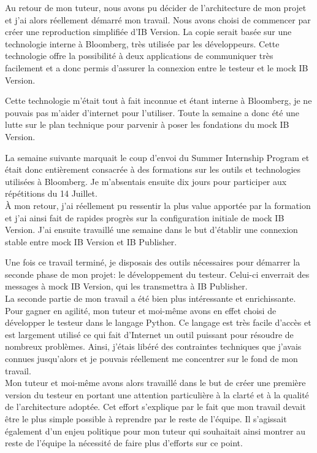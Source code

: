 \documentclass[11pt, oneside, titlepage, a4paper]{article}
\begin{document}
Au retour de mon tuteur, nous avons pu décider de l'architecture de mon projet et j'ai alors réellement démarré mon travail. Nous avons choisi de commencer par créer une reproduction simplifiée d'IB Version. La copie serait basée sur une technologie interne à Bloomberg, très utilisée par les développeurs. Cette technologie offre la possibilité à deux applications de communiquer très facilement et a donc permis d'assurer la connexion entre le testeur et le mock IB Version.

Cette technologie m'était tout à fait inconnue et étant interne à Bloomberg, je ne pouvais pas m'aider d'internet pour l'utiliser. Toute la semaine a donc été une lutte sur le plan technique pour parvenir à poser les fondations du mock IB Version.

La semaine suivante marquait le coup d'envoi du Summer Internship Program et était donc entièrement consacrée à des formations sur les outils et technologies utilisées à Bloomberg. Je m'absentais ensuite dix jours pour participer aux répétitions du 14 Juillet.
\\

À mon retour, j'ai réellement pu ressentir la plus value apportée par la formation et j'ai ainsi fait de rapides progrès sur la configuration initiale de mock IB Version. J'ai ensuite travaillé une semaine dans le but d'établir une connexion stable entre mock IB Version et IB Publisher.

Une fois ce travail terminé, je disposais des outils nécessaires pour démarrer la seconde phase de mon projet: le développement du testeur. Celui-ci enverrait des messages à mock IB Version, qui les transmettra à IB Publisher.
\\

La seconde partie de mon travail a été bien plus intéressante et enrichissante. Pour gagner en agilité, mon tuteur et moi-même avons en effet choisi de développer le testeur dans le langage Python. Ce langage est très facile d'accès et est largement utilisé ce qui fait d'Internet un outil puissant pour résoudre de nombreux problèmes. Ainsi, j'étais libéré des contraintes techniques que j'avais connues jusqu'alors et je pouvais réellement me concentrer sur le fond de mon travail.
\\
Mon tuteur et moi-même avons alors travaillé dans le but de créer une première version du testeur en portant une attention particulière à la clarté et à la qualité de l'architecture adoptée. Cet effort s'explique par le fait que mon travail devait être le plus simple possible à reprendre par le reste de l'équipe. Il s'agissait également d'un enjeu \og politique \fg{} pour mon tuteur qui souhaitait ainsi montrer au reste de l'équipe la nécessité de faire plus d'efforts sur ce point.
\end{document}

